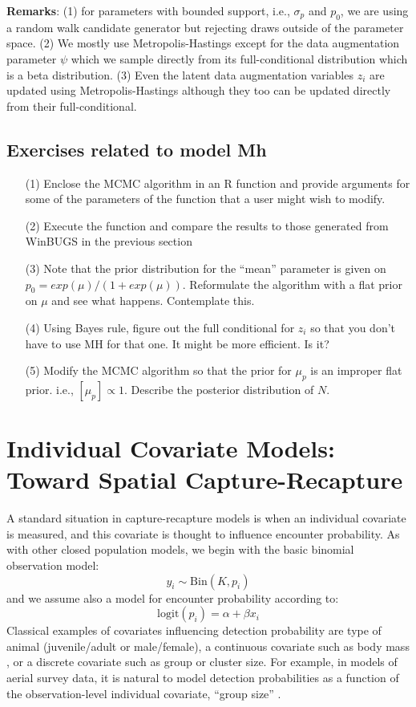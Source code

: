 {\bf Remarks}: (1) for parameters with bounded support, i.e.,
$\sigma_{p}$ and $p_{0}$, we are using a random walk candidate
generator but rejecting draws outside of the parameter space.  (2) We
mostly use Metropolis-Hastings except for the data augmentation
parameter $\psi$ which we sample directly from its full-conditional
distribution which is a beta distribution.  (3) Even the latent data
augmentation variables $z_{i}$ are updated using Metropolis-Hastings
although they too can be updated directly from their full-conditional.

\subsection{Exercises related to model Mh}

\begin{itemize}
\item[(1)] Enclose the MCMC algorithm in an R function and provide
  arguments for some of the parameters of the function that a user
  might wish to modify.
\item[(2)] Execute the function and compare the results to those
  generated from WinBUGS in the previous section
\item[(3)] Note that the prior distribution for the ``mean'' parameter
  is given on $p_0=exp(\mu)/(1+exp(\mu))$.  Reformulate the algorithm
  with a flat prior on $\mu$ and see what happens. Contemplate this.
\item[(4)] Using Bayes rule, figure out the full conditional for
  $z_{i}$ so that you don't have to use MH for that one. It might be
  more efficient. Is it?
\item[(5)] Modify the MCMC algorithm so that the prior for $\mu_{p}$
  is an improper flat prior. i.e., $[\mu_{p}] \propto 1$. Describe the
  posterior distribution of $N$. 
\end{itemize}


\section{Individual Covariate Models: Toward Spatial Capture-Recapture}
\label{closed.sec.indcov}


A standard situation in capture-recapture models is when an individual
covariate is measured, and this covariate is thought to influence
encounter probability.  As with other closed population models, we
begin with the basic binomial observation model:
\[
y_{i} \sim \mbox{Bin}(K, p_{i})
\]
and we assume also  a model for encounter probability according to:
\begin{equation}
 \mbox{logit}(p_{i}) = \alpha + \beta x_{i}
\label{closed.eq.ha}
\end{equation}
Classical examples of covariates influencing detection probability are
type of animal (juvenile/adult or male/female), a continuous covariate
such as body mass \citep[][ch. 6]{royle_dorazio:2008}, or a
discrete covariate such as group or cluster size. For example, in
models of aerial survey data, it is natural to model detection
probabilities as a function of the observation-level individual
covariate, ``group size'' \citep{royle:2008, royle:2009,
  langtimm_etal:2011}.

